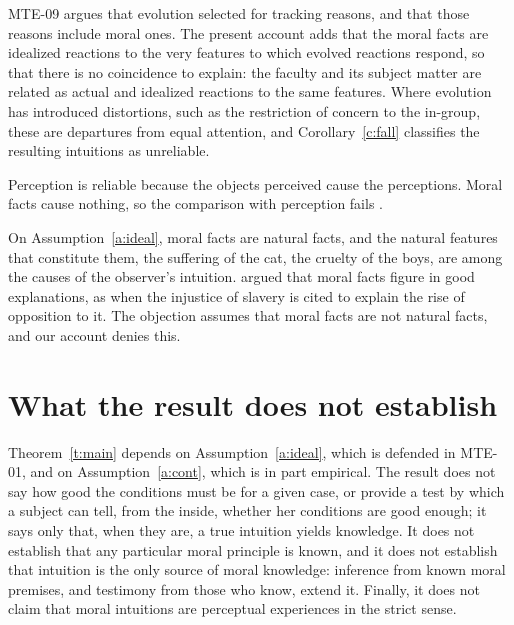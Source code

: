 \documentclass{situationist-preprint}
\begin{document}
\begin{reply}
MTE-09 argues that evolution selected for tracking reasons, and that those reasons include moral ones. The present account adds that the moral facts are idealized reactions to the very features to which evolved reactions respond, so that there is no coincidence to explain: the faculty and its subject matter are related as actual and idealized reactions to the same features. Where evolution has introduced distortions, such as the restriction of concern to the in-group, these are departures from equal attention, and Corollary~\ref{c:fall} classifies the resulting intuitions as unreliable.
\end{reply}

\begin{objection}
Perception is reliable because the objects perceived cause the perceptions. Moral facts cause nothing, so the comparison with perception fails \citep{Harman1977}.
\end{objection}

\begin{reply}
On Assumption~\ref{a:ideal}, moral facts are natural facts, and the natural features that constitute them, the suffering of the cat, the cruelty of the boys, are among the causes of the observer's intuition. \citet{Sturgeon1985} argued that moral facts figure in good explanations, as when the injustice of slavery is cited to explain the rise of opposition to it. The objection assumes that moral facts are not natural facts, and our account denies this.
\end{reply}

\section{What the result does not establish}

Theorem~\ref{t:main} depends on Assumption~\ref{a:ideal}, which is defended in MTE-01, and on Assumption~\ref{a:cont}, which is in part empirical. The result does not say how good the conditions must be for a given case, or provide a test by which a subject can tell, from the inside, whether her conditions are good enough; it says only that, when they are, a true intuition yields knowledge. It does not establish that any particular moral principle is known, and it does not establish that intuition is the only source of moral knowledge: inference from known moral premises, and testimony from those who know, extend it. Finally, it does not claim that moral intuitions are perceptual experiences in the strict sense.
\end{document}
